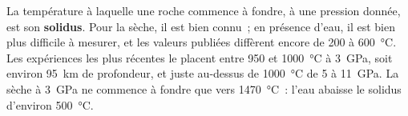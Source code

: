 La température à laquelle une roche commence à fondre, à une pression
donnée, est son \textbf{solidus}. Pour la  sèche, il est bien
connu~; en présence d'eau, il est bien plus difficile à mesurer, et les
valeurs publiées diffèrent encore de 200 à \qty{600}{\celsius}. Les
expériences les plus récentes le placent entre 950 et \qty{1000}{\celsius}
à \qty{3}{GPa}, soit environ \qty{95}{km} de profondeur, et juste au-dessus
de \qty{1000}{\celsius} de 5 à \qty{11}{GPa}. La  sèche à
\qty{3}{GPa} ne commence à fondre que vers \qty{1470}{\celsius}~: l'eau
abaisse le solidus d'environ \qty{500}{\celsius}.

